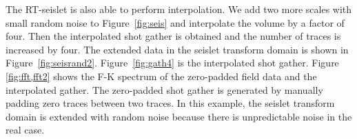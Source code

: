     The RT-seislet is also able to perform interpolation. 
    We add two more scales with small random noise to Figure~\ref{fig:seis} and 
    interpolate the  volume by a factor of four. 
    Then the interpolated shot gather is obtained and the number of traces is 
    increased by four. 
    The extended data in the seislet transform domain is shown in Figure~\ref{fig:seisrand2}. 
    Figure~\ref{fig:gath4} is the interpolated shot gather. 
    Figure \ref{fig:fft,fft2} shows the F-K spectrum of the zero-padded 
    field data and the interpolated gather. 
    The zero-padded shot gather is generated by manually padding zero traces 
    between two traces.
    In this example, the seislet transform domain is extended with random noise 
    because there is unpredictable noise in the real case.



